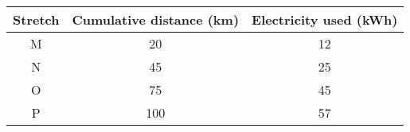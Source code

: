 \begin{tabular}{|c|c|c|}
\hline Stretch & Cumulative distance (km) & Electricity used (kWh) \\
\hline M & 20 & 12 \\
\hline N & 45 & 25 \\
\hline O & 75 & 45 \\
\hline P & 100 & 57 \\
\hline
\end{tabular}